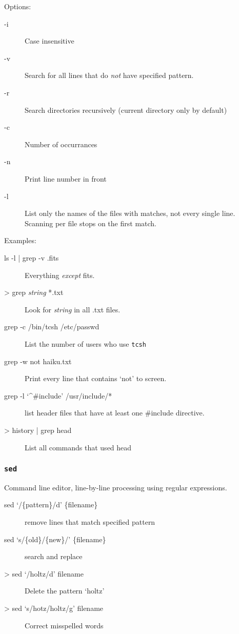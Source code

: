 \documentclass{article}
\begin{document}
Options:
\begin{description}
    \item [-i] Case insensitive
    \item [-v] Search for all lines that do \emph{not} have specified
        pattern.
    \item [-r] Search directories recursively (current directory only
        by default)
    \item [-c] Number of occurrances
    \item [-n] Print line number in front
    \item [-l] List only the names of the files with matches, not
        every single line. Scanning per file stops on the first match.
\end{description}
Examples:
\begin{description}
    \item [ls -l | grep -v .fits] Everything \emph{except} fits.
    \item [> grep \textit{string} *.txt] Look for \emph{string} in all
        .txt files.
    \item [grep -c /bin/tcsh /etc/passwd] List the number of users who
        use \texttt{tcsh}
    \item [grep -w not haiku.txt] Print every line that contains `not'
        to screen.
    \item [grep -l `\^{}\#include' /usr/include/*] list header files that
        have at least one \#include directive.
    \item [> history | grep head] List all commands that used head
\end{description}

\subsubsection{\texttt{sed}}
Command line editor, line-by-line processing using regular
expressions.

\begin{description}
    \item [sed `/\{pattern\}/d' \{filename\}]
        remove lines that match specified pattern
    \item [sed `s/\{old\}/\{new\}/' \{filename\}]
        search and replace
\end{description}
\begin{description}
    \item [> sed `/holtz/d' filename] Delete the pattern `holtz'
    \item [> sed `s/hotz/holtz/g' filename] Correct misspelled words
\end{description}
\end{document}
